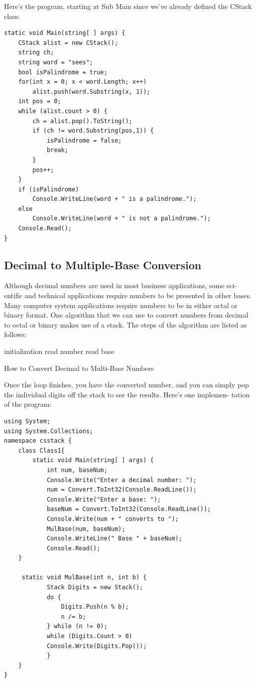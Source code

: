 \documentclass[12pt,a4paper,final,twoside,titlepage]{book}
\begin{document}
Here’s the program, starting at Sub Main since we’ve already defined the CStack class:
\begin{lstlisting}
static void Main(string[ ] args) {
	CStack alist = new CStack();
	string ch;
	string word = "sees";
	bool isPalindrome = true;
	for(int x = 0; x < word.Length; x++)
		alist.push(word.Substring(x, 1)); 
	int pos = 0;
	while (alist.count > 0) {
		ch = alist.pop().ToString(); 
		if (ch != word.Substring(pos,1)) {
  			isPalindrome = false;
			break;
		}
		pos++;
	}
    if (isPalindrome)
    	Console.WriteLine(word + " is a palindrome.");
    else
    	Console.WriteLine(word + " is not a palindrome.");
    Console.Read();
}
\end{lstlisting}
\subsection{Decimal to Multiple-Base Conversion}
Although decimal numbers are used in most business applications, some sci- entific and technical applications require numbers to be presented in other bases. Many computer system applications require numbers to be in either octal or binary format.
One algorithm that we can use to convert numbers from decimal to octal or binary makes use of a stack. The steps of the algorithm are listed as follows:\\
\begin{algorithm}[H]
 \SetAlgoLined
 initialization\;
 read number\;
 read base\; 
 \caption{How to Convert Decimal to Multi-Base Numbers}
\end{algorithm}
Once the loop finishes, you have the converted number, and you can simply pop the individual digits off the stack to see the results. Here’s one implemen- tation of the program:
\begin{lstlisting}
using System;
using System.Collections;
namespace csstack {
	class Class1{
		static void Main(string[ ] args) {
			int num, baseNum;
			Console.Write("Enter a decimal number: ");
			num = Convert.ToInt32(Console.ReadLine());
			Console.Write("Enter a base: ");
			baseNum = Convert.ToInt32(Console.ReadLine()); 
			Console.Write(num + " converts to "); 
			MulBase(num, baseNum);
			Console.WriteLine(" Base " + baseNum); 
			Console.Read();
	}
     
     static void MulBase(int n, int b) {
			Stack Digits = new Stack(); 
			do {
       			Digits.Push(n % b);
				n /= b;
			} while (n != 0);
         	while (Digits.Count > 0)
          	Console.Write(Digits.Pop());
          	}
    } 
}
\end{lstlisting}
\end{document}
